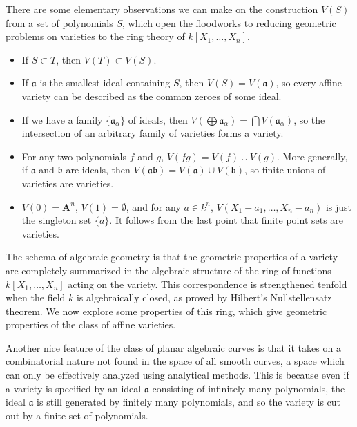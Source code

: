 There are some elementary observations we can make on the construction $V(S)$ from a set of polynomials $S$, which open the floodworks to reducing geometric problems on varieties to the ring theory of $k[X_1, \dots, X_n]$.
%
\begin{itemize}
    \item If $S \subset T$, then $V(T) \subset V(S)$.

    \item If $\mathfrak{a}$ is the smallest ideal containing $S$, then $V(S) = V(\mathfrak{a})$, so every affine variety can be described as the common zeroes of some ideal.

    \item If we have a family $\{ \mathfrak{a}_\alpha \}$ of ideals, then $V(\bigoplus \mathfrak{a}_\alpha) = \bigcap V(\mathfrak{a}_\alpha)$, so the intersection of an arbitrary family of varieties forms a variety.

    \item For any two polynomials $f$ and $g$, $V(fg) = V(f) \cup V(g)$. More generally, if $\mathfrak{a}$ and $\mathfrak{b}$ are ideals, then $V(\mathfrak{a}\mathfrak{b}) = V(\mathfrak{a}) \cup V(\mathfrak{b})$, so finite unions of varieties are varieties.

    \item $V(0) = \mathbf{A}^n$, $V(1) = \emptyset$, and for any $a \in k^n$, $V(X_1-a_1,\dots,X_n - a_n)$ is just the singleton set $\{ a \}$. It follows from the last point that finite point sets are varieties.
\end{itemize}
%
The schema of algebraic geometry is that the geometric properties of a variety are completely summarized in the algebraic structure of the ring of functions $k[X_1, \dots, X_n]$ acting on the variety. This correspondence is strengthened tenfold when the field $k$ is algebraically closed, as proved by Hilbert's Nullstellensatz theorem. We now explore some properties of this ring, which give geometric properties of the class of affine varieties.

Another nice feature of the class of planar algebraic curves is that it takes on a combinatorial nature not found in the space of all smooth curves, a space which can only be effectively analyzed using analytical methods. This is because even if a variety is specified by an ideal $\mathfrak{a}$ consisting of infinitely many polynomials, the ideal $\mathfrak{a}$ is still generated by finitely many polynomials, and so the variety is cut out by a finite set of polynomials.

